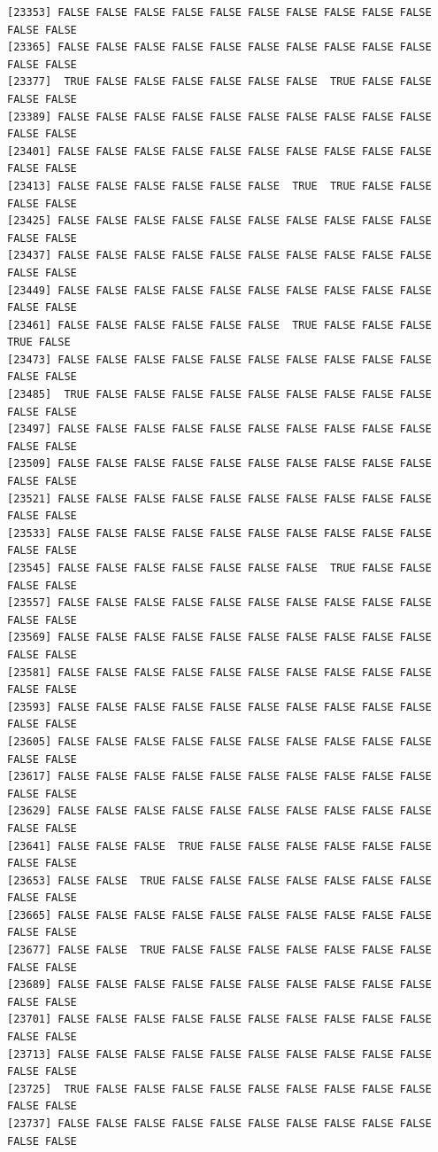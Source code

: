 \documentclass[
  a4paper,
  DIV=11,
  numbers=noendperiod]{scrartcl}
\begin{document}
\begin{verbatim}
[23353] FALSE FALSE FALSE FALSE FALSE FALSE FALSE FALSE FALSE FALSE FALSE FALSE
[23365] FALSE FALSE FALSE FALSE FALSE FALSE FALSE FALSE FALSE FALSE FALSE FALSE
[23377]  TRUE FALSE FALSE FALSE FALSE FALSE FALSE  TRUE FALSE FALSE FALSE FALSE
[23389] FALSE FALSE FALSE FALSE FALSE FALSE FALSE FALSE FALSE FALSE FALSE FALSE
[23401] FALSE FALSE FALSE FALSE FALSE FALSE FALSE FALSE FALSE FALSE FALSE FALSE
[23413] FALSE FALSE FALSE FALSE FALSE FALSE  TRUE  TRUE FALSE FALSE FALSE FALSE
[23425] FALSE FALSE FALSE FALSE FALSE FALSE FALSE FALSE FALSE FALSE FALSE FALSE
[23437] FALSE FALSE FALSE FALSE FALSE FALSE FALSE FALSE FALSE FALSE FALSE FALSE
[23449] FALSE FALSE FALSE FALSE FALSE FALSE FALSE FALSE FALSE FALSE FALSE FALSE
[23461] FALSE FALSE FALSE FALSE FALSE FALSE  TRUE FALSE FALSE FALSE  TRUE FALSE
[23473] FALSE FALSE FALSE FALSE FALSE FALSE FALSE FALSE FALSE FALSE FALSE FALSE
[23485]  TRUE FALSE FALSE FALSE FALSE FALSE FALSE FALSE FALSE FALSE FALSE FALSE
[23497] FALSE FALSE FALSE FALSE FALSE FALSE FALSE FALSE FALSE FALSE FALSE FALSE
[23509] FALSE FALSE FALSE FALSE FALSE FALSE FALSE FALSE FALSE FALSE FALSE FALSE
[23521] FALSE FALSE FALSE FALSE FALSE FALSE FALSE FALSE FALSE FALSE FALSE FALSE
[23533] FALSE FALSE FALSE FALSE FALSE FALSE FALSE FALSE FALSE FALSE FALSE FALSE
[23545] FALSE FALSE FALSE FALSE FALSE FALSE FALSE  TRUE FALSE FALSE FALSE FALSE
[23557] FALSE FALSE FALSE FALSE FALSE FALSE FALSE FALSE FALSE FALSE FALSE FALSE
[23569] FALSE FALSE FALSE FALSE FALSE FALSE FALSE FALSE FALSE FALSE FALSE FALSE
[23581] FALSE FALSE FALSE FALSE FALSE FALSE FALSE FALSE FALSE FALSE FALSE FALSE
[23593] FALSE FALSE FALSE FALSE FALSE FALSE FALSE FALSE FALSE FALSE FALSE FALSE
[23605] FALSE FALSE FALSE FALSE FALSE FALSE FALSE FALSE FALSE FALSE FALSE FALSE
[23617] FALSE FALSE FALSE FALSE FALSE FALSE FALSE FALSE FALSE FALSE FALSE FALSE
[23629] FALSE FALSE FALSE FALSE FALSE FALSE FALSE FALSE FALSE FALSE FALSE FALSE
[23641] FALSE FALSE FALSE  TRUE FALSE FALSE FALSE FALSE FALSE FALSE FALSE FALSE
[23653] FALSE FALSE  TRUE FALSE FALSE FALSE FALSE FALSE FALSE FALSE FALSE FALSE
[23665] FALSE FALSE FALSE FALSE FALSE FALSE FALSE FALSE FALSE FALSE FALSE FALSE
[23677] FALSE FALSE  TRUE FALSE FALSE FALSE FALSE FALSE FALSE FALSE FALSE FALSE
[23689] FALSE FALSE FALSE FALSE FALSE FALSE FALSE FALSE FALSE FALSE FALSE FALSE
[23701] FALSE FALSE FALSE FALSE FALSE FALSE FALSE FALSE FALSE FALSE FALSE FALSE
[23713] FALSE FALSE FALSE FALSE FALSE FALSE FALSE FALSE FALSE FALSE FALSE FALSE
[23725]  TRUE FALSE FALSE FALSE FALSE FALSE FALSE FALSE FALSE FALSE FALSE FALSE
[23737] FALSE FALSE FALSE FALSE FALSE FALSE FALSE FALSE FALSE FALSE FALSE FALSE

\end{verbatim}
\end{document}
